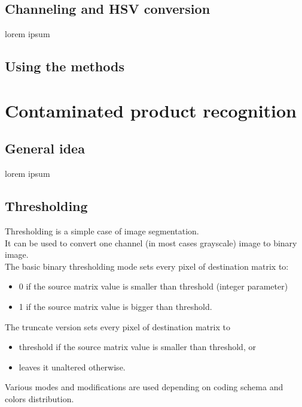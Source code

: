 \documentclass[12pt,twoside,a4paper]{article}
\begin{document}
  


\subsection{Channeling and HSV conversion}
lorem ipsum
\subsection{Using the methods}


\section{Contaminated product recognition}
\subsection{General idea}
lorem ipsum
\subsection{Thresholding}

Thresholding is a simple case of image segmentation.\\
It can be used to convert one channel (in most cases grayscale) image to binary image.\\
The basic binary thresholding mode sets every pixel of destination matrix to:
\begin{itemize}
\item 0 if the source matrix value is smaller than threshold (integer parameter)
\item 1 if the source matrix value is bigger than threshold.
\end{itemize}
The truncate version sets every pixel of destination matrix to
\begin{itemize}
\item threshold if the source matrix value is smaller than threshold, or
\item leaves it unaltered otherwise.
\end{itemize}
Various modes and modifications are used depending on coding schema and colors distribution.
  
\end{document}
